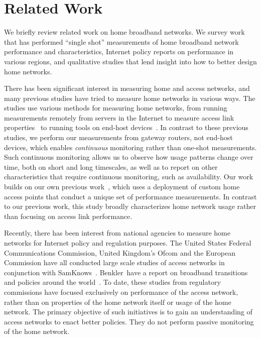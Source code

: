 \section{Related Work}\label{sec:related}

We briefly review related work on home broadband networks.  We survey
work that has performed ``single shot'' measurements of home broadband
network performance and characteristics, Internet policy reports on
performance in various regions, and qualitative studies that lend
insight into how to better design home networks.

  There has been
significant interest in measuring home and access networks, and many
previous studies have tried to measure home networks in various
ways. The studies use various methods for measuring home networks,
from running measurements remotely from servers in the Internet to
measure access link properties~\cite{Dischinger:imc2007} to running
tools on end-host
devices~\cite{DiCioccio:2012,DiCioccio2013,www-netalyzr,Kreibich2010,Sanchez2013,Chetty:2011:WMI}.
In contrast to these previous studies, we perform our measurements from
gateway routers, not end-host devices, which enables {\em continuous}
monitoring rather than one-shot measurements.  Such continuous
monitoring allows us to observe how usage patterns change over time,
both on short and long timescales, as well as to report on other
characteristics that require continuous monitoring, such as availability.
Our work builds on our own previous work~\cite{sundaresan2011}, which
uses a deployment of custom home access points that conduct a unique set
of performance measurements.  In contrast to our previous work, this study
broadly characterizes home network usage rather than focusing
on access link performance.

Recently, there has been interest from national agencies to measure home
networks for Internet policy and regulation purposes.  The United States
Federal Communications Commission, United Kingdom's Ofcom and the
European Commission have all conducted large scale studies of access
networks in conjunction with
SamKnows~\cite{www-fcc-report,www-sk-eu,www-sk-uk}.  Benkler~\etal have
a report on broadband transitions and policies around the
world~\cite{RePEc:reg:wpaper:8}.  To date, these studies from regulatory
commissions have focused exclusively on performance of the access
network, rather than on properties of the home network itself or usage
of the home network.  The primary objective of such initiatives is to
gain an understanding of access networks to enact better policies.  They
do not perform passive monitoring of the home network.

